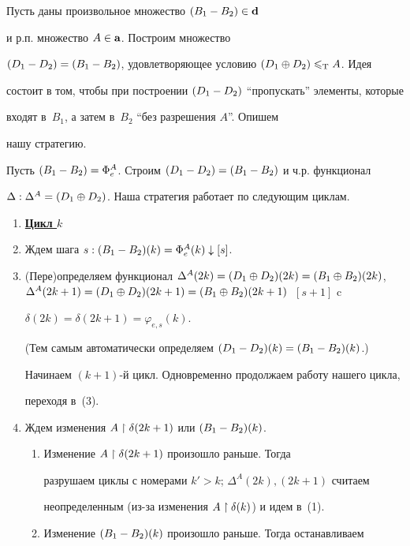 \begin{pf} Пусть даны произвольное \pp множество $(B_1-B_2)\in{\bold d}$


и р.п. множество $A\in{\bold a}$. Построим \pp множество


$(D_1-D_2)=(B_1-B_2)$, удовлетворяющее условию $(D_1\oplus D_2)\leqslant_{\mathrm T}A$. Идея


состоит в том, чтобы при построении $(D_1-D_2)$ ``пропускать'' элементы, которые


входят в~$B_1$, а затем в~$B_2$ ``без разрешения $A$''. Опишем


нашу стратегию. 





Пусть $(B_1-B_2)=\Phi_e^A$. Строим $(D_1-D_2)=(B_1-B_2)$ и ч.р. функционал


$\Delta:\Delta^A=(D_1\oplus D_2)$. Наша стратегия работает по следующим циклам.


\begin{enumerate}


\item[] \underline{\bf Цикл $k$}


\item Ждем шага $s: (B_1-B_2)(k)=\Phi_e^A(k)\downarrow [s]$.


\item (Пере)определяем функционал $\Delta^A(2k)=\dsum(2k)=


(B_1\oplus B_2)(2k)$, $\Delta^A(2k+1)=\dsum(2k+1)=


(B_1\oplus B_2)(2k+1)$~$[s+1]$ c


$\delta(2k)=\delta(2k+1)=\varphi_{e,s}(k)$.


(Тем самым автоматически определяем $(D_1-D_2)(k)=(B_1-B_2)(k)$.)


Начинаем $(k+1)$-й цикл. Одновременно продолжаем работу нашего цикла,


переходя в~(3).


\item Ждем изменения $A\restriction\delta(2k+1)$ или $(B_1-B_2)(k)$.


\begin{enumerate}


\item Изменение $A\restriction\delta(2k+1)$ произошло раньше. Тогда


разрушаем циклы с номерами $k'>k$; $\Delta^A(2k),(2k+1)$ считаем


неопределенным (из-за изменения $A\restriction\delta(k)$) и идем в~(1).


\item Изменение $(B_1-B_2)(k)$ произошло раньше. Тогда останавливаем



\end{enumerate}
\end{enumerate}
\end{pf}
